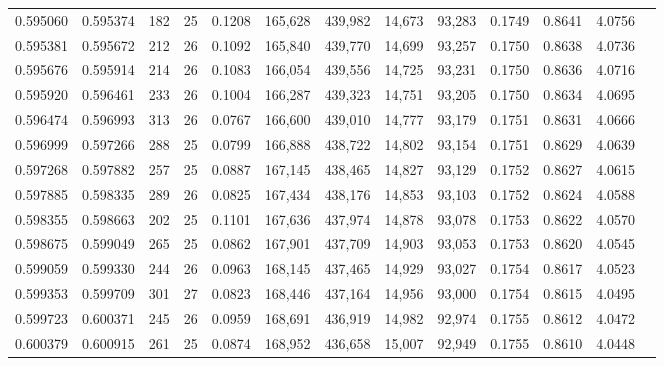 \begin{tabular}{rrrrrrrrrrrrr}
0.595060 & 0.595374 &   182 &  25 &                                     0.1208 & 165,628 & 439,982 &  14,673 &  93,283 & 0.1749 & 0.8641 & 4.0756 \\
0.595381 & 0.595672 &   212 &  26 &                                     0.1092 & 165,840 & 439,770 &  14,699 &  93,257 & 0.1750 & 0.8638 & 4.0736 \\
0.595676 & 0.595914 &   214 &  26 &                                     0.1083 & 166,054 & 439,556 &  14,725 &  93,231 & 0.1750 & 0.8636 & 4.0716 \\
0.595920 & 0.596461 &   233 &  26 &                                     0.1004 & 166,287 & 439,323 &  14,751 &  93,205 & 0.1750 & 0.8634 & 4.0695 \\
0.596474 & 0.596993 &   313 &  26 &                                     0.0767 & 166,600 & 439,010 &  14,777 &  93,179 & 0.1751 & 0.8631 & 4.0666 \\
0.596999 & 0.597266 &   288 &  25 &                                     0.0799 & 166,888 & 438,722 &  14,802 &  93,154 & 0.1751 & 0.8629 & 4.0639 \\
0.597268 & 0.597882 &   257 &  25 &                                     0.0887 & 167,145 & 438,465 &  14,827 &  93,129 & 0.1752 & 0.8627 & 4.0615 \\
0.597885 & 0.598335 &   289 &  26 &                                     0.0825 & 167,434 & 438,176 &  14,853 &  93,103 & 0.1752 & 0.8624 & 4.0588 \\
0.598355 & 0.598663 &   202 &  25 &                                     0.1101 & 167,636 & 437,974 &  14,878 &  93,078 & 0.1753 & 0.8622 & 4.0570 \\
0.598675 & 0.599049 &   265 &  25 &                                     0.0862 & 167,901 & 437,709 &  14,903 &  93,053 & 0.1753 & 0.8620 & 4.0545 \\
0.599059 & 0.599330 &   244 &  26 &                                     0.0963 & 168,145 & 437,465 &  14,929 &  93,027 & 0.1754 & 0.8617 & 4.0523 \\
0.599353 & 0.599709 &   301 &  27 &                                     0.0823 & 168,446 & 437,164 &  14,956 &  93,000 & 0.1754 & 0.8615 & 4.0495 \\
0.599723 & 0.600371 &   245 &  26 &                                     0.0959 & 168,691 & 436,919 &  14,982 &  92,974 & 0.1755 & 0.8612 & 4.0472 \\
0.600379 & 0.600915 &   261 &  25 &                                     0.0874 & 168,952 & 436,658 &  15,007 &  92,949 & 0.1755 & 0.8610 & 4.0448 \\

\end{tabular}

